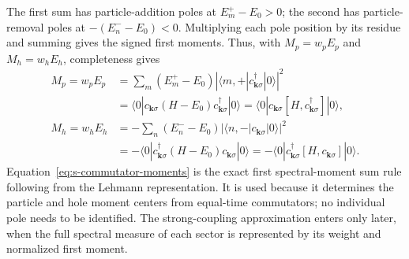 \documentclass[10pt]{article}
\begin{document}
The first sum has particle-addition poles at $E_m^+-E_0>0$; the second has
particle-removal poles at $-(E_n^--E_0)<0$.  Multiplying each pole position
by its residue and summing gives the signed first moments.  Thus, with
$M_p=w_pE_p$ and $M_h=w_hE_h$, completeness gives
\begin{equation}
\begin{aligned}
M_p=w_pE_p
&=\sum_m(E_m^+-E_0)
 \left|\langle m,+|c^\dagger_{\mathbf k\sigma}|0\rangle\right|^2\\
&=\langle0|c_{\mathbf k\sigma}(H-E_0)
 c^\dagger_{\mathbf k\sigma}|0\rangle
=\langle0|c_{\mathbf k\sigma}[H,c^\dagger_{\mathbf k\sigma}]|0\rangle,\\
M_h=w_hE_h
&=-\sum_n(E_n^--E_0)
 \left|\langle n,-|c_{\mathbf k\sigma}|0\rangle\right|^2\\
&=-\langle0|c^\dagger_{\mathbf k\sigma}(H-E_0)
 c_{\mathbf k\sigma}|0\rangle
=-\langle0|c^\dagger_{\mathbf k\sigma}[H,c_{\mathbf k\sigma}]|0\rangle.
\end{aligned}
\label{eq:s-commutator-moments}
\end{equation}
Equation~\ref{eq:s-commutator-moments} is the exact first spectral-moment
sum rule following from the Lehmann representation.  It is used because it
determines the particle and hole moment centers from equal-time commutators;
no individual pole needs to be identified.  The strong-coupling approximation
enters only later, when the full spectral measure of each sector is represented
by its weight and normalized first moment.
\end{document}
